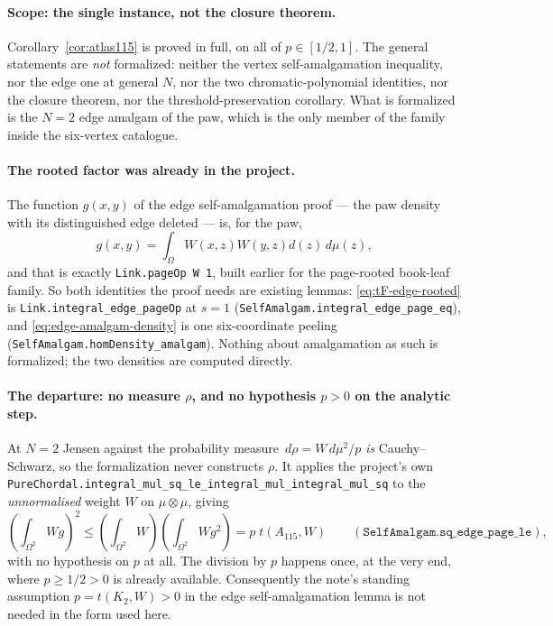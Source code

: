 \documentclass[11pt]{article}
\begin{document}
\paragraph{Scope: the single instance, not the closure theorem.}
Corollary~\ref{cor:atlas115} is proved in full, on all of $p\in[1/2,1]$.  The
general statements are \emph{not} formalized: neither the vertex
self-amalgamation inequality, nor the edge one at general $N$, nor the two
chromatic-polynomial identities, nor the closure theorem, nor the
threshold-preservation corollary.  What is formalized is the $N=2$ edge
amalgam of the paw, which is the only member of the family inside the
six-vertex catalogue.

\paragraph{The rooted factor was already in the project.}
The function $g(x,y)$ of the edge self-amalgamation proof --- the paw density
with its distinguished edge deleted --- is, for the paw,
\[
 g(x,y)=\int_\Omega W(x,z)W(y,z)d(z)\,d\mu(z),
\]
and that is exactly \texttt{Link.pageOp W 1}, built earlier for the page-rooted
book-leaf family.  So both identities the proof needs are existing lemmas:
\eqref{eq:tF-edge-rooted} is \texttt{Link.integral\_edge\_pageOp} at $s=1$
(\texttt{SelfAmalgam.integral\_edge\_page\_eq}), and
\eqref{eq:edge-amalgam-density} is one six-coordinate peeling
(\texttt{SelfAmalgam.homDensity\_amalgam}).  Nothing about amalgamation as such
is formalized; the two densities are computed directly.

\paragraph{The departure: no measure $\rho$, and no hypothesis $p>0$ on the
analytic step.}
At $N=2$ Jensen against the probability measure
$\,d\rho=W\,d\mu^2/p$ \emph{is} Cauchy--Schwarz, so the formalization never
constructs $\rho$.  It applies the project's own
\texttt{PureChordal.integral\_mul\_sq\_le\_integral\_mul\_integral\_mul\_sq} to
the \emph{unnormalised} weight $W$ on $\mu\otimes\mu$, giving
\[
 \left(\int_{\Omega^2}Wg\right)^2
 \leq\left(\int_{\Omega^2}W\right)\left(\int_{\Omega^2}Wg^2\right)
 =p\;t(A_{115},W)
 \qquad(\texttt{SelfAmalgam.sq\_edge\_page\_le}),
\]
with no hypothesis on $p$ at all.  The division by $p$ happens once, at the very
end, where $p\geq1/2>0$ is already available.  Consequently the note's standing
assumption $p=t(K_2,W)>0$ in the edge self-amalgamation lemma is not needed in
the form used here.
\end{document}
